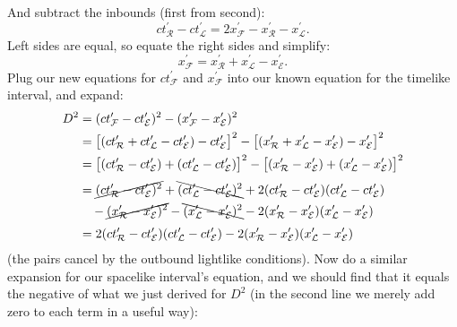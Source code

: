 \documentclass[12pt]{article}
\begin{document}
And subtract the inbounds (first from second):
\begin{equation*}
ct^{\prime}_{\mathcal{R}} - ct^{\prime}_{\mathcal{L}} = 2 x^{\prime}_{\mathcal{F}} - x^{\prime}_{\mathcal{R}} - x^{\prime}_{\mathcal{L}} .
\end{equation*}
Left sides are equal, so equate the right sides and simplify:
\begin{equation*}
x^{\prime}_{\mathcal{F}} = x^{\prime}_{\mathcal{R}} + x^{\prime}_{\mathcal{L}} - x^{\prime}_{\mathcal{E}} .
\end{equation*}
Plug our new equations for $ct^{\prime}_{\mathcal{F}}$ and $x^{\prime}_{\mathcal{F}}$ into our known equation for the timelike interval, and expand:
\begin{equation*}
\begin{aligned}
D^2 &= (ct^{\prime}_{\mathcal{F}} - ct^{\prime}_{\mathcal{E}})^2 - (x^{\prime}_{\mathcal{F}} - x^{\prime}_{\mathcal{E}})^2 \\
&= \big[ ( ct^{\prime}_{\mathcal{R}} + ct^{\prime}_{\mathcal{L}} - ct^{\prime}_{\mathcal{E}} ) - ct^{\prime}_{\mathcal{E}} \big]^2 - \big[ ( x^{\prime}_{\mathcal{R}} + x^{\prime}_{\mathcal{L}} - x^{\prime}_{\mathcal{E}} ) - x^{\prime}_{\mathcal{E}} \big]^2 \\
&= \big[ ( ct^{\prime}_{\mathcal{R}} - ct^{\prime}_{\mathcal{E}}) + (ct^{\prime}_{\mathcal{L}} - ct^{\prime}_{\mathcal{E}} ) \big]^2 - \big[ ( x^{\prime}_{\mathcal{R}} - x^{\prime}_{\mathcal{E}} ) + ( x^{\prime}_{\mathcal{L}}  - x^{\prime}_{\mathcal{E}} ) \big]^2 \\[3pt]
&= \cancel{( ct^{\prime}_{\mathcal{R}} - ct^{\prime}_{\mathcal{E}})^2} + \bcancel{(ct^{\prime}_{\mathcal{L}} - ct^{\prime}_{\mathcal{E}} )^2} + 2 ( ct^{\prime}_{\mathcal{R}} - ct^{\prime}_{\mathcal{E}}) (ct^{\prime}_{\mathcal{L}} - ct^{\prime}_{\mathcal{E}} ) \\
& \quad - \cancel{( x^{\prime}_{\mathcal{R}} - x^{\prime}_{\mathcal{E}} )^2} - \bcancel{( x^{\prime}_{\mathcal{L}}  - x^{\prime}_{\mathcal{E}} )^2} - 2 ( x^{\prime}_{\mathcal{R}} - x^{\prime}_{\mathcal{E}} ) ( x^{\prime}_{\mathcal{L}}  - x^{\prime}_{\mathcal{E}} ) \\[3pt]
&= 2 ( ct^{\prime}_{\mathcal{R}} - ct^{\prime}_{\mathcal{E}}) (ct^{\prime}_{\mathcal{L}} - ct^{\prime}_{\mathcal{E}} ) - 2 ( x^{\prime}_{\mathcal{R}} - x^{\prime}_{\mathcal{E}} ) ( x^{\prime}_{\mathcal{L}}  - x^{\prime}_{\mathcal{E}} )
\end{aligned}
\end{equation*}
(the pairs cancel by the outbound lightlike conditions). Now do a similar expansion for our spacelike interval's equation, and we should find that it equals the negative of what we just derived for $D^2$ (in the second line we merely add zero to each term in a useful way):
\end{document}
